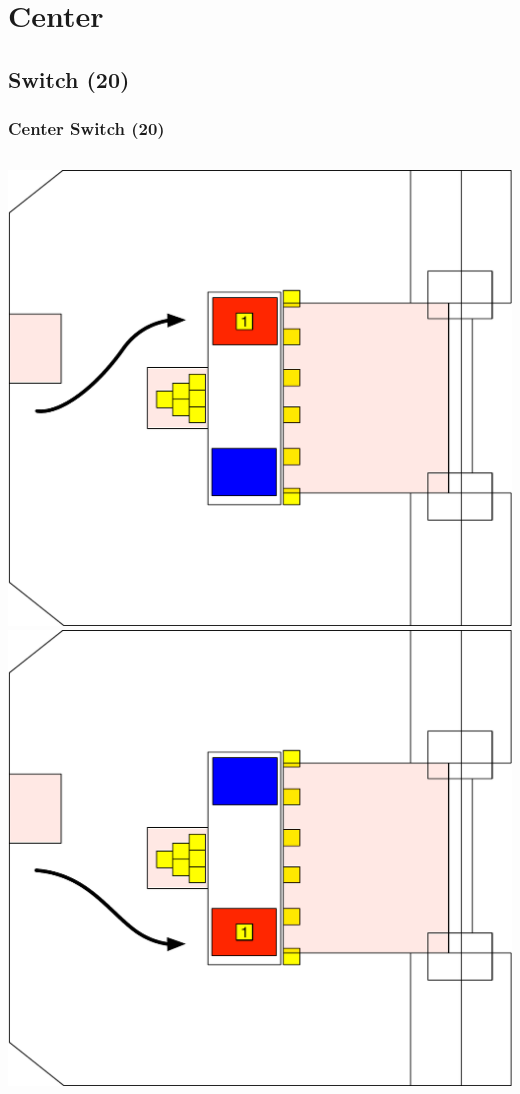 \documentclass{beamer}
\begin{document}
\section{Center}
\subsection{Switch (20)}

\begin{frame}
 \frametitle{Center Switch \alert{(20)}}
 \begin{columns}
  \includegraphics[scale=0.25]{assets/paths/20_LX}
  \includegraphics[scale=0.25]{assets/paths/20_RX}
 \end{columns}
\end{frame}
\end{document}
